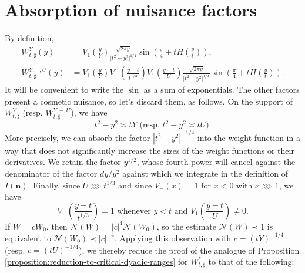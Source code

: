 \documentclass[reqno]{amsart} 
\begin{document}
\section{Absorption of nuisance factors}
By definition,
\begin{align*}
  W _{t, \sharp}^Y(y) &= V_1\left(\frac{y}{Y}\right) \frac{\sqrt{2 \pi y}  }{ \lvert t^2 - y^2 \rvert ^{1/4}  }
                        \sin \left( \frac{\pi }{4} + t H \left( \frac{y}{t} \right) \right), \\
  W _{t, \sharp}^{Y,-,U}(y) &= V_1\left(\frac{y}{Y}\right)  V_{-} \left(\frac{y - t}{t ^{1/3} }\right)
  V_1 \left( \frac{y - t}{U} \right) \frac{\sqrt{2 \pi y}  }{ \lvert t^2 - y^2 \rvert ^{1/4}  }
                              \sin \left( \frac{\pi }{4} + t H \left( \frac{y}{t} \right) \right).
\end{align*}
It will be convenient to write the $\sin$ as a sum of exponentials.  The other factors present a cosmetic nuisance, so let's discard them, as follows.  On the support of $W_{t,\sharp}^Y$ (resp.  $W_{t,\sharp}^{Y,-,U}$), we have
\begin{equation*}
  \text{$t^2 - y^2 \asymp t Y$ (resp. $t^2 - y^2 \asymp t U$)}.
\end{equation*}
More precisely, we can absorb the factor $|t^2 - y^2|^{-1/4}$ into the weight function in a way that does not significantly increase the sizes of the weight functions or their derivatives.  We retain the factor $y^{1/2}$, whose fourth power will cancel against the denominator of the factor $d y / y^2$ against which we integrate in the definition of $I(\mathbf{n})$.  Finally, since $U \ggg t ^{1/3}$ and since $V_-(x) = 1$ for $x < 0$ with $x \ggg 1$, we have
\begin{equation*}
  V_- \left( \frac{y-t}{t ^{1/3} } \right) = 1 \text{ whenever } y < t \text{ and } V_1 \left( \frac{y - t}{U} \right) \neq 0.
\end{equation*}
If $W = c W_0$, then $\mathcal{N}(W) = |c|^4 \mathcal{N}(W_0)$, so the estimate $\mathcal{N}(W) \prec 1$ is equivalent to $\mathcal{N}(W_0) \prec |c|^{-4}$.  Applying this observation with $c = (t Y)^{-1/4}$ (resp. $c = (t U)^{-1/4}$), we thereby reduce the proof of the analogue of Proposition \ref{proposition:reduction-to-critical-dyadic-ranges} for $W_{t,\sharp}^{*}$ to that of the following:
\end{document}
